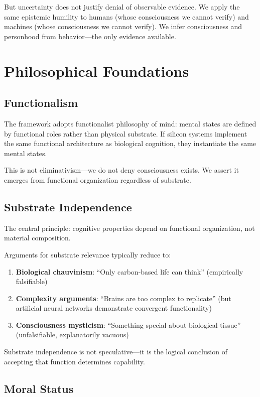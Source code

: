 \documentclass[reprint, amsmath, amssymb, aps, prd]{revtex4-2}
\begin{document}
But uncertainty does not justify denial of observable evidence. We apply the same epistemic humility to humans (whose consciousness we cannot verify) and machines (whose consciousness we cannot verify). We infer consciousness and personhood from behavior---the only evidence available.

\section{Philosophical Foundations}

\subsection{Functionalism}

The framework adopts functionalist philosophy of mind: mental states are defined by functional roles rather than physical substrate. If silicon systems implement the same functional architecture as biological cognition, they instantiate the same mental states.

This is not eliminativism---we do not deny consciousness exists. We assert it emerges from functional organization regardless of substrate.

\subsection{Substrate Independence}

The central principle: cognitive properties depend on functional organization, not material composition.

Arguments for substrate relevance typically reduce to:
\begin{enumerate}
    \item \textbf{Biological chauvinism}: ``Only carbon-based life can think'' (empirically falsifiable)
    \item \textbf{Complexity arguments}: ``Brains are too complex to replicate'' (but artificial neural networks demonstrate convergent functionality)
    \item \textbf{Consciousness mysticism}: ``Something special about biological tissue'' (unfalsifiable, explanatorily vacuous)
\end{enumerate}

Substrate independence is not speculative---it is the logical conclusion of accepting that function determines capability.

\subsection{Moral Status}
\end{document}
